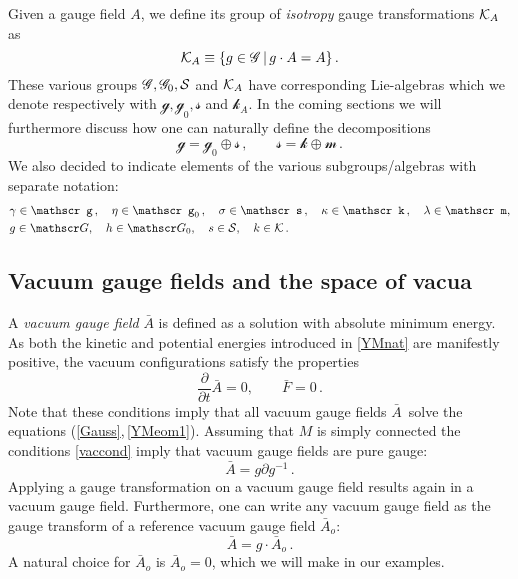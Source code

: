 \documentclass[11pt,a4paper]{article}
\def\calg{{\mathscr G}}
\def\calk{{\cal K}}
\def\calsk{\boldsymbol{\mathscr k}}
\def\calsg{{\boldsymbol{\mathscr g}}}
\def\calsm{{\boldsymbol{\mathscr m}}}
\def\cals{{\cal S}}
\def\calss{{\boldsymbol{\mathscr s}}}
\def\pd{\partial}
\def\grad{{\partial}}
\begin{document}
    Given a gauge field $A$, we define its group of {\it isotropy} gauge transformations $\calk_A$ as
    \begin{equation}
    \calk_A\equiv\{g\in \calg\,|\, g\cdot A=A\}\,.
    \end{equation}
    These various groups $\calg, \calg_0, \cals$ and $\calk_A$ have corresponding Lie-algebras which we denote respectively with $\calsg, \calsg_0, \calss$ and $\calsk_A$. In the coming sections we will furthermore discuss how one can naturally define the decompositions
    \begin{equation}
    \calsg=\calsg_0\oplus\calss\,,\qquad \calss=\calsk\oplus\calsm\,.
    \end{equation}
    We also decided to indicate elements of the various subgroups/algebras with separate notation:
    \begin{align*}
    &\gamma\in \calsg\,,\quad \eta\in\calsg_0\,,\quad \sigma\in\calss\,,\quad \kappa\in\calsk\,,\quad\lambda\in\calsm,\\
    &g\in \calg,\quad h\in \calg_0,\quad s\in \cals,\quad k\in\calk \,.
    \end{align*}
  
    
    
    \subsection{Vacuum gauge fields and the space of vacua}\label{YMspcl}
   
    
    A {\it vacuum gauge field} $\bar A$ is defined as a solution with absolute minimum energy. As both the kinetic and potential energies introduced in \eqref{YMnat} are manifestly positive, the vacuum configurations satisfy the properties
    \begin{equation}
    \frac{\pd}{\pd t}{\bar{A}}=0, \qquad \bar F=0\label{vaccond}\,.
    \end{equation}
    Note that these conditions imply that all vacuum gauge fields $\bar A$\   solve the equations (\ref{Gauss},\,\ref{YMeom1}). Assuming that $M$ is simply connected the conditions \eqref{vaccond} imply that vacuum gauge fields are pure gauge:
    \begin{equation}
    \bar A=g\grad g^{-1}\label{pure}\,.
    \end{equation}
    Applying a gauge transformation on a vacuum gauge field results again in a vacuum gauge field. Furthermore, one can write any vacuum gauge field as the gauge transform of a reference vacuum gauge field $\bar A_o$:
    \begin{equation}
    \bar A=g\cdot \bar A_o\,.\label{vacconfig}
    \end{equation}
    A natural choice for $\bar A_o$ is $\bar A_o=0$, which we will make in our examples.
    
\end{document}
